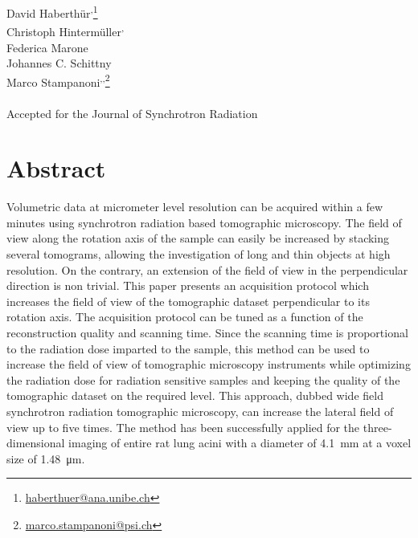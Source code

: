 \acresetall
{}\label{ch:haberthuer2010}

David Haberthür\textsuperscript{,}\footnote{\href{mailto:haberthuer@ana.unibe.ch}{haberthuer@ana.unibe.ch}}\\
Christoph Hintermüller\textsuperscript{,}\\
Federica Marone\\
Johannes C. Schittny\\
Marco Stampanoni\textsuperscript{,}\textsuperscript{,}\footnote{\href{mailto:marco.stampanoni@psi.ch}{marco.stampanoni@psi.ch}}\\\\
Accepted for the Journal of Synchrotron Radiation\\
\vfill
\section{Abstract}
Volumetric data at micrometer level resolution can be acquired within a few minutes using synchrotron radiation based tomographic microscopy. The field of view along the rotation axis of the sample can easily be increased by stacking several tomograms, allowing  the investigation of long and thin objects at high resolution. On the contrary, an extension of the field of view in the perpendicular direction is non trivial. This paper presents an acquisition protocol which increases the field of view of the tomographic dataset perpendicular to its rotation axis. The acquisition protocol can be tuned as a function of the reconstruction quality and scanning time. Since the scanning time is proportional to the radiation dose imparted to the sample, this method can be used to increase the field of view of tomographic microscopy instruments while optimizing the radiation dose for radiation sensitive samples and keeping the quality of the tomographic dataset on the required level. This approach, dubbed wide field synchrotron radiation tomographic microscopy, can increase the lateral field of view up to five times. The method has been successfully applied for the three-dimensional imaging of entire rat lung acini with a diameter of \SI{4.1}{\milli\meter} at a voxel size of \SI{1.48}{\micro\meter}.
\clearpage
